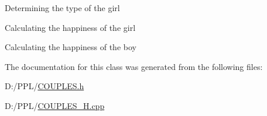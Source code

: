 Determining the type of the girl

Calculating the happiness of the girl

Calculating the happiness of the boy 

The documentation for this class was generated from the following files\+:\begin{DoxyCompactItemize}
\item 
D\+:/\+P\+P\+L/\hyperlink{_c_o_u_p_l_e_s_8h}{C\+O\+U\+P\+L\+E\+S.\+h}\item 
D\+:/\+P\+P\+L/\hyperlink{_c_o_u_p_l_e_s___h_8cpp}{C\+O\+U\+P\+L\+E\+S\+\_\+\+H.\+cpp}\end{DoxyCompactItemize}
